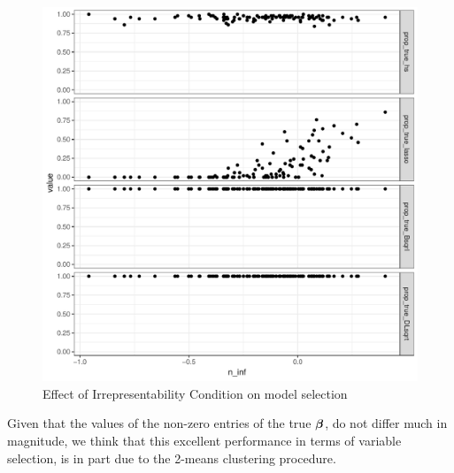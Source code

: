 \documentclass[chapters]{uamaththesis}
\begin{document}
\begin{figure}[ht!]%
\centering
\includegraphics[angle = 90 , origin = c , width=0.95\columnwidth , height =.45\textheight]{Irrep_model_selec_n100p60_q50_2groups}%
\caption{Effect of Irrepresentability Condition on model selection }%
\label{fig:profile:MSP_irrep}%
\end{figure}

Given that the values of the non-zero entries of the true $\boldsymbol{\beta}$, do not differ much in magnitude, we think that this excellent performance in terms of variable selection, is in part due to the 2-means clustering procedure. 
\end{document}
